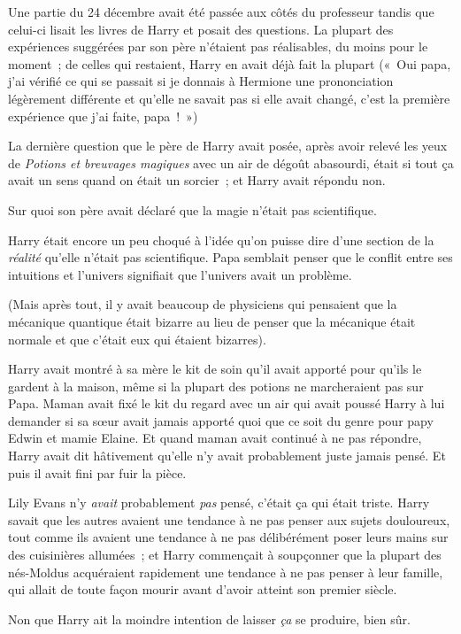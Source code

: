 Une partie du 24 décembre avait été passée aux côtés du professeur tandis que celui-ci lisait les livres de Harry et posait des questions.
La plupart des expériences suggérées par son père n'étaient pas réalisables, du moins pour le moment~; de celles qui restaient, Harry en avait déjà fait la plupart («~Oui papa, j'ai vérifié ce qui se passait si je donnais à Hermione une prononciation légèrement différente et qu'elle ne savait pas si elle avait changé, c'est la première expérience que j'ai faite, papa~!~»)

La dernière question que le père de Harry avait posée, après avoir relevé les yeux de \emph{Potions et breuvages magiques} avec un air de dégoût abasourdi, était si tout ça avait un sens quand on était un sorcier~; et Harry avait répondu non.

Sur quoi son père avait déclaré que la magie n'était pas scientifique.

Harry était encore un peu choqué à l'idée qu'on puisse dire d'une section de la \emph{réalité} qu'elle n'était pas scientifique.
Papa semblait penser que le conflit entre ses intuitions et l'univers signifiait que l'univers avait un problème.

(Mais après tout, il y avait beaucoup de physiciens qui pensaient que la mécanique quantique était bizarre au lieu de penser que la mécanique était normale et que c'était eux qui étaient bizarres).

Harry avait montré à sa mère le kit de soin qu'il avait apporté pour qu'ils le gardent à la maison, même si la plupart des potions ne marcheraient pas sur Papa.
Maman avait fixé le kit du regard avec un air qui avait poussé Harry à lui demander si sa sœur avait jamais apporté quoi que ce soit du genre pour papy Edwin et mamie Elaine.
Et quand maman avait continué à ne pas répondre, Harry avait dit hâtivement qu'elle n'y avait probablement juste jamais pensé.
Et puis il avait fini par fuir la pièce.

Lily Evans n'y \emph{avait} probablement \emph{pas} pensé, c'était ça qui était triste.
Harry savait que les autres avaient une tendance à ne pas penser aux sujets douloureux, tout comme ils avaient une tendance à ne pas délibérément poser leurs mains sur des cuisinières allumées~; et Harry commençait à soupçonner que la plupart des nés-Moldus acquéraient rapidement une tendance à ne pas penser à leur famille, qui allait de toute façon mourir avant d'avoir atteint son premier siècle.

Non que Harry ait la moindre intention de laisser \emph{ça} se produire, bien sûr.

